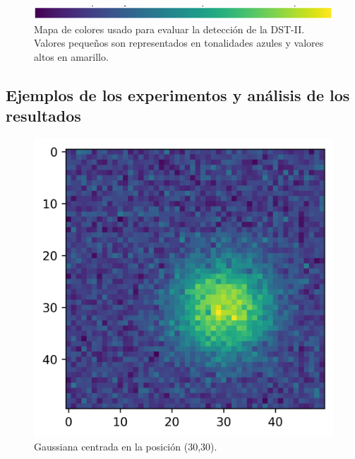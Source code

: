 \begin{figure}
	\centering
	\includegraphics[scale=0.8]{Graphics/colormap.png} 
	\caption{Mapa de colores usado para evaluar la detección de la DST-II. Valores pequeños son representados en tonalidades azules y valores altos en amarillo.} \label{fig:colormap}
\end{figure}

\subsection{Ejemplos de los experimentos y análisis de los resultados}

\begin{figure}
	\centering
	\includegraphics{Graphics/gaussian-2d-experiment.png}
	\caption{Gaussiana centrada en la posición (30,30).} \label{fig:gaussian-example-experiment}
\end{figure}

